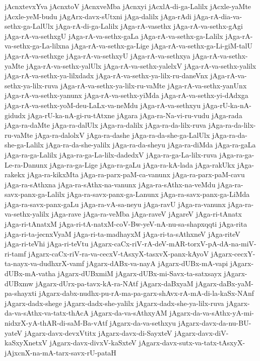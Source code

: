 {jAcnxtevxYva
jAcnxtoV
jAcnxveMba
jAcnxyi
jAcxlA-di-ga-Lalilx
jAcxle-yaMte
jAcxle-yeM-budu
jAgArx-davx-sUtxni
jAga-dalilx
jAga-rAdi
jAga-rA-dia-va-sethx-ga-LalUlx
jAga-rA-di-ga-Lalilx
jAga-rA-vasethx
jAga-rA-va-sethx-gAgi
jAga-rA-va-sethxgU
jAga-rA-va-sethx-gaLa
jAga-rA-va-sethx-ga-Lalilx
jAga-rA-va-sethx-ga-La-lilxna
jAga-rA-va-sethx-ga-Lige
jAga-rA-va-sethx-ga-Li-giM-talU
jAga-rA-va-sethxge
jAga-rA-va-sethxyU
jAga-rA-va-sethxya
jAga-rA-va-sethx-yaMte
jAga-rA-va-sethx-yalUlx
jAga-rA-va-sethx-yalelxV
jAga-rA-va-sethx-yalilx
jAga-rA-va-sethx-ya-lilxdadx
jAga-rA-va-sethx-ya-lilx-ru-daneVnx
jAga-rA-va-sethx-ya-lilx-ruva
jAga-rA-va-sethx-ya-lilx-ru-vaMte
jAga-rA-va-sethx-yanUnx
jAga-rA-va-sethx-yanunx
jAga-rA-va-sethx-yiMda
jAga-rA-va-sethx-yi-dAdxga
jAga-rA-va-sethx-yoM-deu-LaLx-va-neMdu
jAga-rA-va-sethxyu
jAga-rU-ka-nA-gidudx
jAga-rU-ka-nA-gi-ru-tAtxne
jAgara
jAga-ra-Na-vi-ru-vudu
jAga-rada
jAga-ra-daMte
jAga-ra-dalUlx
jAga-ra-dalilx
jAga-ra-da-lilx-ruva
jAga-ra-da-lilx-ru-vaMte
jAga-ra-dalolxV
jAga-ra-dashe
jAga-ra-da-she-ga-LalUlx
jAga-ra-da-she-ga-Lalilx
jAga-ra-da-she-yalilx
jAga-ra-da-sheyu
jAga-ra-diMda
jAga-ra-gaLa
jAga-ra-ga-Lalilx
jAga-ra-ga-La-lilx-dadedxV
jAga-ra-ga-La-lilx-ruva
jAga-ra-ga-Le-ra-Danunx
jAga-ra-ga-Lige
jAga-ra-gaLu
jAga-ra-kA-lada
jAga-rakUkx
jAga-rakekx
jAga-ra-kikxMta
jAga-ra-parx-paM-ca-vanunx
jAga-ra-parx-paM-cavu
jAga-ra-sAthxna
jAga-ra-sAthx-na-vanunx
jAga-ra-sAthx-na-veMdu
jAga-ra-savx-panx-ga-Lalilx
jAga-ra-savx-panx-ga-Lanunx
jAga-ra-savx-panx-ga-LiMda
jAga-ra-savx-panx-gaLu
jAga-ra-vA-sa-neyu
jAga-ravU
jAga-ra-vanunx
jAga-ra-va-sethx-yalilx
jAga-rave
jAga-ra-veMba
jAga-raveV
jAgareV
jAga-ri-tAnatx
jAga-ri-tAnatxM
jAga-ri-tA-natxM-coV-Bw-yeV-nA-nu-sa-shapxqqti
jAga-rita
jAga-ri-ta-jecnxVyaM
jAga-ri-ta-madhayxM
jAga-ri-ta-sAthxneV
jAga-riteV
jAga-ri-teVhi
jAga-ri-teVtu
jAgarx-caCx-riV-rA-deV-mAR-torxV-pA-dA-na-miV-ri-tamf
jAgarx-caCx-riV-ra-va-cecxV-tAsxyX-tasxvX-panx-kAyoV
jAgarx-cecxY-ta-nayx-va-dudhxrX-vamf
jAgarx-dABx-va-nayA
jAgarx-dUBx-mA-vapi
jAgarx-dUBx-mA-vatha
jAgarx-dUBxmiM
jAgarx-dUBx-mi-Savx-ta-satxsayx
jAgarx-dUBxmw
jAgarx-dUrx-pa-tavx-kA-ra-NAtf
jAgarx-daBxyaM
jAgarx-daBx-yaM-pa-shayxti
jAgarx-dabx-nudhx-pu-rA-ma-pa-garx-shAvx-rA-mA-di-la-kaSx-NAnf
jAgarx-dadx-shege
jAgarx-dadx-she-yalilx
jAgarx-dadx-she-ya-lilx-ruva
jAgarx-da-va-sAthx-va-tatx-thAcA
jAgarx-da-va-sAthxyAM
jAgarx-da-va-sAthx-yA-mi-nidxrX-yA-thAR-di-saM-Ba-vAtf
jAgarx-da-va-sethxyu
jAgarx-davx-da-nu-BU-yateV
jAgarx-davx-devxVtitx
jAgarx-davx-di-SayxteV
jAgarx-davx-diV-kaSxyXnetxV
jAgarx-davx-divxV-kaSxteV
jAgarx-davx-sutx-va-tatx-tAsxyX-jAjxcnX-na-mA-tarx-savx-rU-pataH
}
